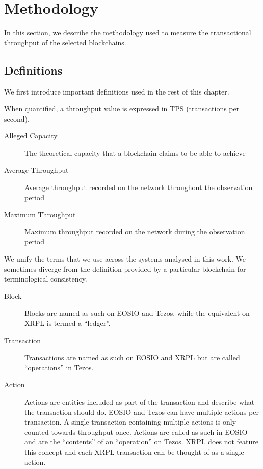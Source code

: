 
\section{Methodology}
\label{sec:4:methodology}
In this section, we describe the methodology used to measure the transactional throughput of the selected blockchains.

\subsection{Definitions}
We first introduce important definitions used in the rest of this chapter.

When quantified, a throughput value is expressed in TPS (transactions per second).
\begin{description}
  \item[Alleged Capacity] The theoretical capacity that a blockchain claims to be able to achieve
  \item[Average Throughput] Average throughput recorded on the network throughout the observation period
  \item[Maximum Throughput] Maximum throughput recorded on the network during the observation period
\end{description}

We unify the terms that we use across the systems analysed in this work.
We sometimes diverge from the definition provided by a particular blockchain for terminological consistency.

\begin{description}
  \item[Block] Blocks are named as such on EOSIO and Tezos, while the equivalent on XRPL is termed a ``ledger''.
  \item[Transaction] Transactions are named as such on EOSIO and XRPL but are called ``operations'' in Tezos.
  \item[Action] Actions are entities included as part of the transaction and describe what the transaction should do. EOSIO and Tezos can have multiple actions per transaction. A single transaction containing multiple actions is only counted towards throughput once.
    Actions are called as such in EOSIO and are the ``contents'' of an ``operation'' on Tezos. XRPL does not feature this concept and each XRPL transaction can be thought of as a single action.
\end{description}


